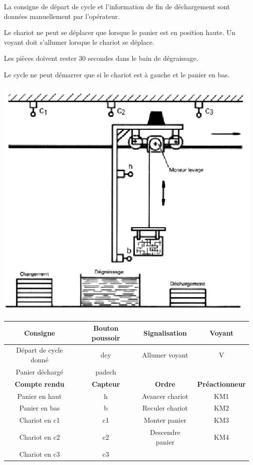 \begin{minipage}{0.5\linewidth}
La consigne de départ de cycle et l'information de fin de déchargement sont données manuellement par l'opérateur. 

Le chariot ne peut se déplacer que lorsque le panier est en position haute. Un voyant doit s'allumer lorsque le chariot se déplace. 

Les pièces doivent rester 30 secondes dans le bain de dégraissage. 

Le cycle ne peut démarrer que si le chariot est à gauche et le panier en bas.
\end{minipage}
\hfill
\begin{minipage}{0.48\linewidth}
 \centering\includegraphics[width=0.7\linewidth]{img/Traitement2.png} 
\end{minipage}

\begin{tabular}{|c|c|c|c|}
\hline
\textbf{Consigne} & \textbf{Bouton poussoir} & \textbf{Signalisation} & \textbf{Voyant} \\
\hline
Départ de cycle donné & dcy & Allumer voyant & V \\
\hline
Panier déchargé & padech & & \\
\hline
\textbf{Compte rendu} & \textbf{Capteur} & \textbf{Ordre} & \textbf{Préactionneur} \\
\hline
Panier en haut & h & Avancer chariot & KM1 \\
\hline
Panier en bas & b & Reculer chariot & KM2 \\
\hline
Chariot en c1 & c1 & Monter panier & KM3 \\ 
\hline
Chariot en c2 & c2 & Descendre panier & KM4 \\
\hline
Chariot en c3 & c3 & & \\
\hline
\end{tabular}

